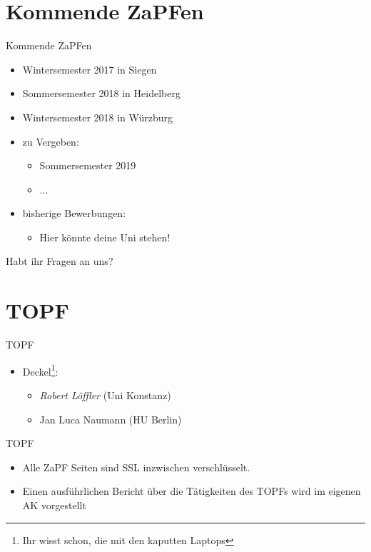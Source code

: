 \documentclass[compress, aspectratio=169]{beamer}
\begin{document}
\section{Kommende ZaPFen}
\begin{frame}{Kommende ZaPFen}
  \begin{itemize}
    \item Wintersemester 2017 in Siegen
    \item Sommersemester 2018 in Heidelberg
    \item Wintersemester 2018 in Würzburg
    \item zu Vergeben:
      \begin{itemize}
      \item Sommersemester 2019
      \item ...
      \end{itemize}
    \item bisherige Bewerbungen:
      \begin{itemize}
      \item Hier könnte deine Uni stehen!
      \end{itemize}
    \end{itemize}
\end{frame}

\begin{frame}[plain]
  \begin{center}
    \Huge Habt ihr Fragen an uns?
    \end{center}
\end{frame}

\section{TOPF}
\begin{frame}{TOPF}
  \begin{itemize}
    \item[] Deckel\footnote{Ihr wisst schon, die mit den kaputten Laptops}:
      \begin{itemize}
      \item \emph{Robert Löffler} (Uni Konstanz)
      \item Jan Luca Naumann (HU Berlin)
      \end{itemize}
    \end{itemize}
\end{frame}

\begin{frame}{TOPF}
  \begin{itemize}
  \item Alle ZaPF Seiten sind SSL inzwischen verschlüsselt. %
  \item Einen ausführlichen Bericht über die Tätigkeiten des TOPFs wird im eigenen AK vorgestellt
  \end{itemize}
\end{frame}
\end{document}

